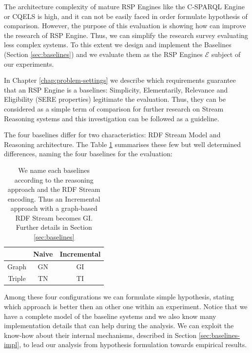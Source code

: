The architecture complexity of mature RSP Engines like the C-SPARQL Engine or CQELS is high, and it can not be easily faced in order formulate hypothesis of comparison. However, the purpose of this evaluation is showing how \name can improve the research of RSP Engine. Thus, we can simplify the research survey evaluating less complex systems. To this extent we design and implement the Baselines (Section \ref{sec:baselines}) and we evaluate them as the RSP Engines $\mathcal{E}$ subject of our experiments. 

In Chapter \ref{chap:problem-settings} we describe which requirements guarantee that an RSP Engine is a baselines: Simplicity, Elementarily, Relevance and Eligibility (SERE properties) legitimate the evaluation. Thus, they can be considered as a simple term of comparison for further research on Stream Reasoning systems and this investigation can be followed as a guideline.
 
The four baselines differ for two characteristics: RDF Stream Model and Reasoning architecture. The Table \ref{tab:baselines-names} summarises these few but well determined differences, naming the four baselines for the evaluation:
\begin{table}[htb]
\centering
\large
\begin{tabular}{c|cc} %
	\hline
         & Naive & Incremental\\
	\hline
	Graph        &  GN      & GI\\
	Triple   &  TN   & TI\\
	\hline %
\end{tabular}
\caption[Baselines Naming Convention]{We name each baselines according to  the reasoning approach and the RDF Stream encoding. Thus an Incremental approach with a graph-based RDF Stream becomes GI. Further details in Section \ref{sec:baselines}}
\label{tab:baselines-names}
\end{table}

\noindent Among these four configurations we can formulate simple hypothesis, stating which approach is better then an other one within an experiment. Notice that we have a complete model of the baseline systems and we also know many implementation details that can help during the analysis. We can exploit the know-how about their internal mechanisms, described in Section \ref{sec:baselines-impl}, to lead our analysis from hypothesis formulation towards empirical results. 


